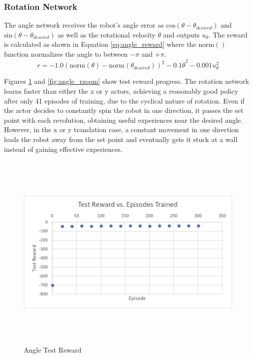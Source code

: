 \subsubsection{Rotation Network}
The angle network receives the robot's angle error as $\text{cos}(\theta-\theta_{desired})$ and $\text{sin}(\theta-\theta_{desired})$ as well as the rotational velocity $\dot{\theta}$ and outputs $u_\theta$. The reward is calculated as shown in Equation \ref{eq:angle_reward} where the $\text{norm}()$ function normalizes the angle to between $-\pi$ and $+\pi$.
\begin{equation}
r = -1.0(\text{norm}(\theta)-\text{norm}(\theta_{desired}))^2-0.1\dot{\theta}^2-0.001u_\theta^2
\label{eq:angle_reward}
\end{equation}

Figures \ref{fig:angle_r} and \ref{fig:angle_rzoom} show test reward progress. The rotation network learns faster than either the x or y actors, achieving a reasonably good policy after only 41 episodes of training, due to the cyclical nature of rotation. Even if the actor decides to constantly spin the robot in one direction, it passes the set point with each revolution, obtaining useful experiences near the desired angle. However, in the x or y translation case, a constant movement in one direction leads the robot away from the set point and eventually gets it stuck at a wall instead of gaining effective experiences.
\begin{figure}[H]
	\centering
	\includegraphics[width=6in, height=3.85in, keepaspectratio]{figures/train_figs/angle_r.pdf}
	\caption{Angle Test Reward} \label{fig:angle_r}
\end{figure}
